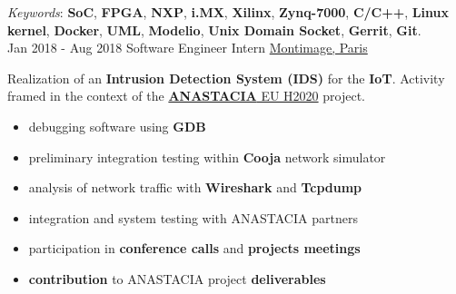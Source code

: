 \documentclass[letterpaper]{twentysecondcv} %
\begin{document}
\begin{twenty}
{            \vspace{1 mm}
            \textit{Keywords}: \textbf{SoC}, \textbf{FPGA}, \textbf{NXP}, \textbf{i.MX}, \textbf{Xilinx}, \textbf{Zynq-7000}, \textbf{C/C++}, \textbf{Linux kernel}, \textbf{Docker}, \textbf{UML}, \textbf{Modelio}, \textbf{Unix Domain Socket}, \textbf{Gerrit}, \textbf{Git}.
        }\\
    \twentyitem
    	{Jan 2018 -}
		{Aug 2018}
        {Software Engineer Intern}
        {\href{https://www.montimage.com/}{Montimage, Paris}}
        {}
        {
            Realization of an \textbf{Intrusion Detection System (IDS)} for the \textbf{IoT}. Activity framed in the context of the \href{http://www.anastacia-h2020.eu/}{\textbf{ANASTACIA} EU H2020} project.
            \vspace{1 mm}
            \begin{itemize}
                \item debugging software using \textbf{GDB}
                \item preliminary integration testing within \textbf{Cooja} network simulator
                \item analysis of network traffic with \textbf{Wireshark} and \textbf{Tcpdump}
                \item integration and system testing with ANASTACIA partners
                \item participation in \textbf{conference calls} and \textbf{projects meetings}
                \item \textbf{contribution} to ANASTACIA project \textbf{deliverables}
            \end{itemize}

}
\end{twenty}
\end{document}
